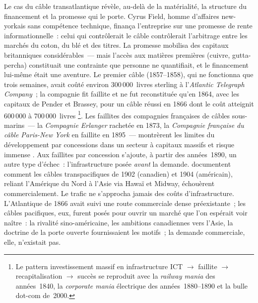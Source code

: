%
Le cas du câble transatlantique révèle, au-delà de la matérialité, la structure du financement et la promesse qui le porte. Cyrus Field, homme d'affaires new-yorkais sans compétence technique, finança l'entreprise sur une promesse de rente informationnelle~: celui qui contrôlerait le câble contrôlerait l'arbitrage entre les marchés du coton, du blé et des titres. La promesse mobilisa des capitaux britanniques considérables~--- mais l'accès aux matières premières (cuivre, gutta-percha) constituait une contrainte que personne ne quantifiait, et le financement lui-même était une aventure. Le premier câble (1857--1858), qui ne fonctionna que trois semaines, avait coûté environ 300\,000~livres sterling à l'\emph{Atlantic Telegraph Company}~; la compagnie fit faillite et ne fut reconstituée qu'en 1864, avec les capitaux de Pender et Brassey, pour un câble réussi en 1866 dont le coût atteignit 600\,000 à 700\,000~livres \parencite{gordon_thread_2002}\footnote{Le pattern investissement massif en infrastructure ICT $\rightarrow$ faillite $\rightarrow$ recapitalisation $\rightarrow$ succès se reproduit avec la \emph{railway mania} des années~1840, la \emph{corporate mania} électrique des années~1880--1890 et la bulle dot-com de~2000.}. Les faillites des compagnies françaises de câbles sous-marins~--- la \emph{Compagnie Erlanger} rachetée en 1873, la \emph{Compagnie française du câble Paris-New York} en faillite en 1895~--- montrèrent les limites du développement par concessions dans un secteur à capitaux massifs et risque immense \parencite{bata_cables_1982, headrick_invisible_1991}. Aux faillites par concession s'ajoute, à partir des années~1890, un autre type d'échec~: l'infrastructure posée \emph{avant} la demande. \textcite{muller_telegraph_2015} documentent comment les câbles transpacifiques de 1902 (canadien) et 1904 (américain), reliant l'Amérique du Nord à l'Asie via Hawaï et Midway, échouèrent commercialement. Le trafic ne s'approcha jamais des coûts d'infrastructure. L'Atlantique de 1866 avait suivi une route commerciale dense préexistante~; les câbles pacifiques, eux, furent posés pour ouvrir un marché que l'on espérait voir naître~: la rivalité sino-américaine, les ambitions canadiennes vers l'Asie, la doctrine de la porte ouverte fournissaient les motifs~; la demande commerciale, elle, n'existait pas. %
